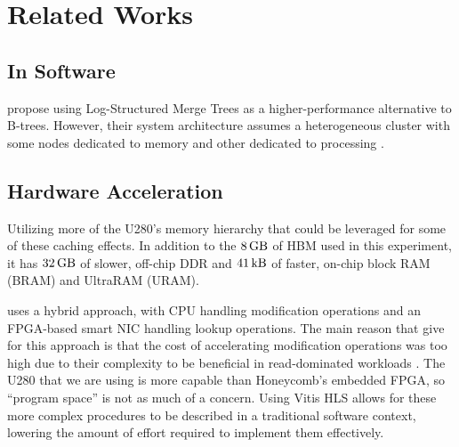 \chapter{Related Works}

\section{In Software}

\citeauthor{dlsm} propose using Log-Structured Merge Trees as a higher-performance alternative to B-trees. However, their system architecture assumes a heterogeneous cluster with some nodes dedicated to memory and other dedicated to processing \autocite{dlsm}.


\section{Hardware Acceleration}

Utilizing more of the U280's memory hierarchy that could be leveraged for some of these caching effects. In addition to the $\SI{8}{\giga\byte}$ of HBM used in this experiment, it has $\SI{32}{\giga\byte}$ of slower, off-chip DDR and $\SI{41}{\kilo\byte}$ of faster, on-chip block RAM (BRAM) and UltraRAM (URAM).

 uses a hybrid approach, with CPU handling modification operations and an FPGA-based smart NIC handling lookup operations. The main reason that \citeauthor{honeycomb} give for this approach is that the cost of accelerating modification operations was too high due to their complexity to be beneficial in read-dominated workloads \autocite{honeycomb}. The U280 that we are using is more capable than Honeycomb's embedded FPGA, so ``program space'' is not as much of a concern. Using Vitis HLS allows for these more complex procedures to be described in a traditional software context, lowering the amount of effort required to implement them effectively.
